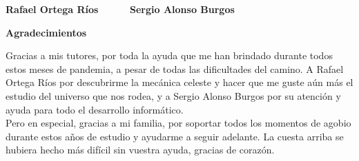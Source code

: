 \vspace{5cm}

\noindent \textbf{Rafael Ortega Ríos \ \ \ \ \ Sergio Alonso Burgos}


\clearpage{\thispagestyle{empty}\cleardoublepage}

\thispagestyle{empty}


\begin{Huge}
\textbf{Agradecimientos}
\end{Huge}
\thispagestyle{empty}

\vspace{1cm}

Gracias a mis tutores, por toda la ayuda que me han brindado durante todos estos meses de pandemia, a pesar de todas las dificultades del camino. A Rafael Ortega Ríos por descubrirme la mecánica celeste y hacer que me guste aún más el estudio del universo que nos rodea, y a Sergio Alonso Burgos por su atención y ayuda para todo el desarrollo informático.\\

Pero en especial, gracias a mi familia, por soportar todos los momentos de agobio durante estos años de estudio y ayudarme a seguir adelante. La cuesta arriba se hubiera hecho más difícil sin vuestra ayuda, gracias de corazón.

\clearpage{\thispagestyle{empty}\cleardoublepage}

\thispagestyle{empty}

